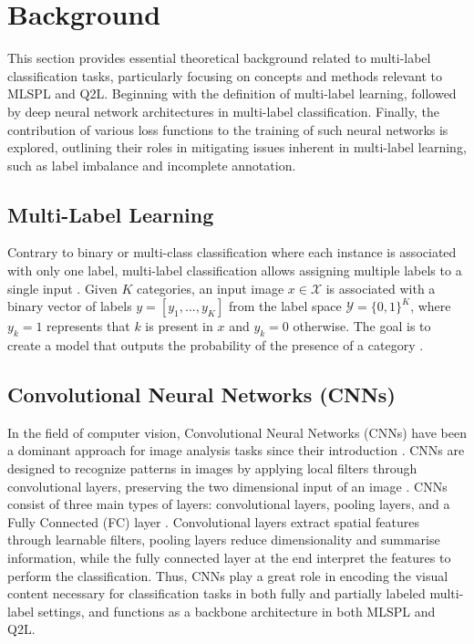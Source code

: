 \documentclass[lettersize,journal]{IEEEtran}
\begin{document}
\section{Background}
This section provides essential theoretical background related to multi-label classification tasks, particularly focusing on concepts and methods relevant to MLSPL and Q2L.  Beginning with the definition of multi-label learning, followed by deep neural network architectures in multi-label classification. Finally, the contribution of various loss functions to the training of such neural networks is explored, outlining their roles in mitigating issues inherent in multi-label learning, such as label imbalance and incomplete annotation.

\subsection{Multi-Label Learning}
Contrary to binary or multi-class classification where each instance is associated with only one label, multi-label classification allows assigning multiple labels to a single input \cite{mlsp}. Given $K$ categories, an input image $x\in \mathcal{X}$ is associated with a binary vector of labels $y=[y_1,...,y_K]$ from the label space $\mathcal{Y}=\{0,1\}^K$, where $y_k=1$ represents that $k$ is present in $x$ and $y_k=0$ otherwise. The goal is to create a model that outputs the probability of the presence of a category  \cite{mlsp,Query2Label}.

\subsection{Convolutional Neural Networks (CNNs)}
In the field of computer vision, Convolutional Neural Networks (CNNs) have been a dominant approach for image analysis tasks since their introduction \cite{lecun95}. CNNs are designed to recognize patterns in images by applying local filters through convolutional layers, preserving the two dimensional input of an image \cite{zhang2023dive}. CNNs consist of three main types of layers: convolutional layers, pooling layers, and a Fully Connected (FC) layer \cite{asawaCS231n}. Convolutional layers extract spatial features through learnable filters, pooling layers reduce dimensionality and summarise information, while the fully connected layer at the end interpret the features to perform the classification. Thus, CNNs play a great role in encoding the visual content necessary for classification tasks in both fully and partially labeled multi-label settings, and functions as a backbone architecture in both MLSPL and Q2L.
\end{document}
